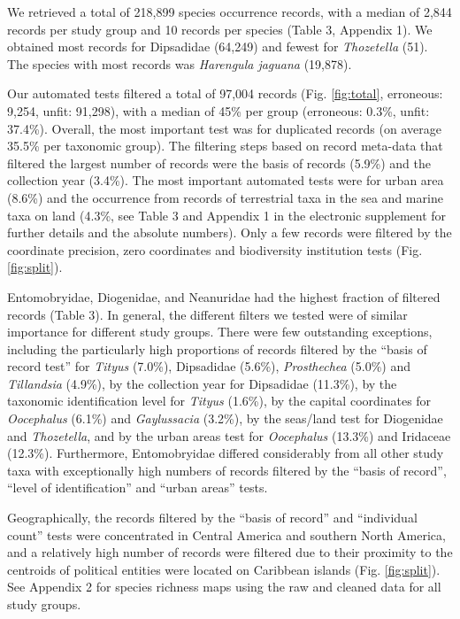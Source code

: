 \documentclass[fleqn,10pt,lineno]{wlpeerj} %
\begin{document}
We retrieved a total of 218,899 species occurrence records, with a median of 2,844 records per study group and 10 records per species (Table 3, Appendix 1). We obtained most records for Dipsadidae (64,249) and fewest for \emph{Thozetella} (51). The species with most records was \emph{Harengula jaguana} (19,878).

Our automated tests filtered a total of 97,004 records (Fig. \ref{fig:total}, erroneous: 9,254, unfit: 91,298), with a median of 45\% per group (erroneous: 0.3\%, unfit: 37.4\%). Overall, the most important test was for duplicated records (on average 35.5\% per taxonomic group). The filtering steps based on record meta-data that filtered the largest number of records were the basis of records (5.9\%) and the collection year (3.4\%). The most important automated tests were for urban area (8.6\%) and the occurrence from records of terrestrial taxa in the sea and marine taxa on land (4.3\%, see Table 3 and Appendix 1 in the electronic supplement for further details and the absolute numbers). Only a few records were filtered by the coordinate precision, zero coordinates and biodiversity institution tests (Fig. \ref{fig:split}).

Entomobryidae, Diogenidae, and Neanuridae had the highest fraction of filtered records (Table 3). In general, the different filters we tested were of similar importance for different study groups. There were few outstanding exceptions, including the particularly high proportions of records filtered by the ``basis of record test'' for \emph{Tityus} (7.0\%), Dipsadidae (5.6\%), \emph{Prosthechea} (5.0\%) and \emph{Tillandsia} (4.9\%), by the collection year for Dipsadidae (11.3\%), by the taxonomic identification level for \emph{Tityus} (1.6\%), by the capital coordinates for \emph{Oocephalus} (6.1\%) and \emph{Gaylussacia} (3.2\%), by the seas/land test for Diogenidae and \emph{Thozetella}, and by the urban areas test for \emph{Oocephalus} (13.3\%) and Iridaceae (12.3\%). Furthermore, Entomobryidae differed considerably from all other study taxa with exceptionally high numbers of records filtered by the ``basis of record'', ``level of identification'' and ``urban areas'' tests.

Geographically, the records filtered by the ``basis of record'' and ``individual count'' tests were concentrated in Central America and southern North America, and a relatively high number of records were filtered due to their proximity to the centroids of political entities were located on Caribbean islands (Fig. \ref{fig:split}). See Appendix 2 for species richness maps using the raw and cleaned data for all study groups.
\end{document}
